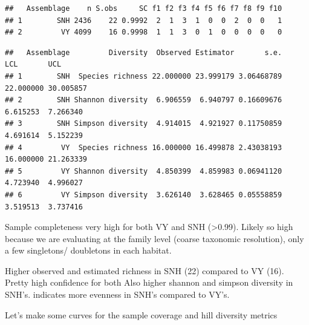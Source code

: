 \documentclass[
]{article}
\newenvironment{Shaded}{\begin{snugshade}}{\end{snugshade}}
\newcommand{\AttributeTok}[1]{\textcolor[rgb]{0.13,0.29,0.53}{#1}}
\newcommand{\CommentTok}[1]{\textcolor[rgb]{0.56,0.35,0.01}{\textit{#1}}}
\newcommand{\DecValTok}[1]{\textcolor[rgb]{0.00,0.00,0.81}{#1}}
\newcommand{\FunctionTok}[1]{\textcolor[rgb]{0.13,0.29,0.53}{\textbf{#1}}}
\newcommand{\NormalTok}[1]{#1}
\newcommand{\OtherTok}[1]{\textcolor[rgb]{0.56,0.35,0.01}{#1}}
\newcommand{\SpecialCharTok}[1]{\textcolor[rgb]{0.81,0.36,0.00}{\textbf{#1}}}
\newcommand{\StringTok}[1]{\textcolor[rgb]{0.31,0.60,0.02}{#1}}
\begin{document}
\begin{verbatim}
##   Assemblage    n S.obs     SC f1 f2 f3 f4 f5 f6 f7 f8 f9 f10
## 1        SNH 2436    22 0.9992  2  1  3  1  0  0  2  0  0   1
## 2         VY 4099    16 0.9998  1  1  3  0  1  0  0  0  0   0
\end{verbatim}

\begin{Shaded}
\end{Shaded}

\begin{verbatim}
##   Assemblage         Diversity  Observed Estimator       s.e.       LCL       UCL
## 1        SNH  Species richness 22.000000 23.999179 3.06468789 22.000000 30.005857
## 2        SNH Shannon diversity  6.906559  6.940797 0.16609676  6.615253  7.266340
## 3        SNH Simpson diversity  4.914015  4.921927 0.11750859  4.691614  5.152239
## 4         VY  Species richness 16.000000 16.499878 2.43038193 16.000000 21.263339
## 5         VY Shannon diversity  4.850399  4.859983 0.06941120  4.723940  4.996027
## 6         VY Simpson diversity  3.626140  3.628465 0.05558859  3.519513  3.737416
\end{verbatim}

Sample completeness very high for both VY and SNH (\textgreater0.99).
Likely so high because we are evaluating at the family level (coarse
taxonomic resolution), only a few singletons/ doubletons in each
habitat.

Higher observed and estimated richness in SNH (22) compared to VY (16).
Pretty high confidence for both Also higher shannon and simpson
diversity in SNH's. indicates more evenness in SNH's compared to VY's.

Let's make some curves for the sample coverage and hill diversity
metrics
\end{document}
